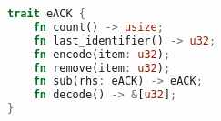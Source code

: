 \begin{lstfloat}[t]
\begin{lstlisting}[language=Rust]
trait eACK {
    fn count() -> usize;
    fn last_identifier() -> u32;
    fn encode(item: u32);
    fn remove(item: u32);
    fn sub(rhs: eACK) -> eACK;
    fn decode() -> &[u32];
}
\end{lstlisting}
\label{lst:quack-interface}
\end{lstfloat}
